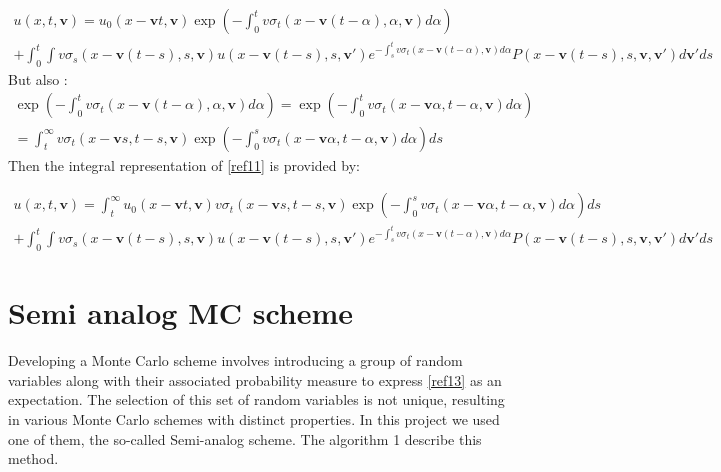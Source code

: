 \documentclass[a4paper, 11pt]{article}
\begin{document}
\begin{multline}
u(x,t,\textbf{v}) = u_0(x - \textbf{v}t, \textbf{v}) \exp\left(- \int_{0}^{t} v\sigma_t\left(x - \textbf{v}(t - \alpha), \alpha, \textbf{v}\right) d\alpha\right) \\
+ \int_{0}^{t} \int v\sigma_s\left(x - \textbf{v}(t - s), s, \textbf{v}\right) u\left(x - \textbf{v}(t - s), s, \textbf{v}'\right) e^{- \int_s^t v\sigma_t\left(x - \textbf{v}(t - \alpha), \textbf{v}\right) d\alpha} P\left(x - \textbf{v}(t - s), s, \textbf{v}, \textbf{v}'\right) d\textbf{v}'ds \label{ref1}
\end{multline}
But also :
\begin{multline}
\exp\left(- \int_{0}^{t} v\sigma_t\left(x - \textbf{v}(t - \alpha), \alpha, \textbf{v}\right) d\alpha\right) = \exp\left(- \int_{0}^{t} v\sigma_t\left(x - \textbf{v} \alpha,t- \alpha, \textbf{v}\right) d\alpha\right) \\ = \int _t^\infty  v\sigma_t\left(x - \textbf{v} s,t- s, \textbf{v}\right)
\exp\left(- \int_{0}^{s} v\sigma_t\left(x - \textbf{v} \alpha,t- \alpha, \textbf{v}\right) d\alpha\right) ds
\end{multline}
Then the integral representation of \ref{ref11} is provided by:

\begin{multline}
u(x,t,\textbf{v}) =  \int _t^\infty  u_0(x - \textbf{v}t, \textbf{v}) v\sigma_t\left(x - \textbf{v} s,t- s, \textbf{v}\right)
\exp\left(- \int_{0}^{s} v\sigma_t\left(x - \textbf{v} \alpha,t- \alpha, \textbf{v}\right) d\alpha\right) ds\\
+ \int_{0}^{t} \int v\sigma_s\left(x - \textbf{v}(t - s), s, \textbf{v}\right) u\left(x - \textbf{v}(t - s), s, \textbf{v}'\right) e^{- \int_s^t v\sigma_t\left(x - \textbf{v}(t - \alpha), \textbf{v}\right) d\alpha} P\left(x - \textbf{v}(t - s), s, \textbf{v}, \textbf{v}'\right) d\textbf{v}'ds \label{ref13}
\end{multline}


\section{Semi analog MC scheme}

Developing a Monte Carlo scheme involves introducing a group of random variables along with their associated probability measure to express \ref{ref13} as an expectation. The selection of this set of random variables is not unique, resulting in various Monte Carlo schemes with distinct properties. In this project we used one of them, the so-called Semi-analog scheme. The algorithm 1 describe this method.
\end{document}
